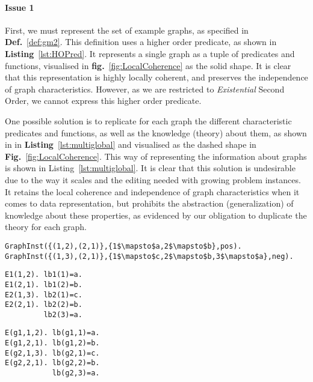 \documentclass{article}
\theoremstyle{definition}
\newcommand{\graphset}[1]{\ensuremath{\mathbb{#1}}}
\begin{document}
\paragraph{Issue 1}
First, we must represent the set of example graphs, as specified in \textbf{Def.}~\ref{def:gm2}. 
This definition uses a higher order predicate, as shown in \textbf{Listing}~\ref{lst:HOPred}. 
It represents a single graph as a tuple of predicates and functions, visualised in \textbf{fig.}~\ref{fig:LocalCoherence} as the solid shape.
It is clear that this representation is highly locally coherent, and preserves the independence of graph characteristics.
However, as we are restricted to \emph{Existential} Second Order, we cannot express this higher order predicate.

One possible solution is to replicate for each graph the different characteristic predicates and functions, as well as the knowledge (theory) about them, as shown in
in \textbf{Listing}~\ref{lst:multiglobal} and visualised as the dashed shape in \textbf{Fig.}~\ref{fig:LocalCoherence}.
This way of representing the information about graphs is shown in Listing~\ref{lst:multiglobal}.
It is clear that this solution is undesirable due to the way it scales and the editing needed with growing problem instances.
It retains the local coherence and independence of graph characteristics when it comes to data representation, but prohibits the abstraction (generalization) of knowledge about these properties, as evidenced by our obligation to duplicate the theory for each graph.

\begin{lstlisting}[mathescape,caption=Higher order predicate modelling the set $\graphset{G}$ of Def~\ref{def:gm2}.,label=lst:HOPred]
GraphInst({(1,2),(2,1)},{1$\mapsto$a,2$\mapsto$b},pos).
GraphInst({(1,3),(2,1)},{1$\mapsto$c,2$\mapsto$b,3$\mapsto$a},neg).
\end{lstlisting}
\begin{minipage}[t]{0.5\textwidth}
\begin{lstlisting}[mathescape,caption=Multiple global relations,label=lst:multiglobal]
E1(1,2). lb1(1)=a.
E1(2,1). lb1(2)=b.
E2(1,3). lb2(1)=c.
E2(2,1). lb2(2)=b.
         lb2(3)=a.
\end{lstlisting}
\end{minipage}
\begin{minipage}[t]{0.5\textwidth}
\begin{lstlisting}[mathescape,caption=Indexed global relation,label=lst:indexedglobal]
E(g1,1,2). lb(g1,1)=a.
E(g1,2,1). lb(g1,2)=b.
E(g2,1,3). lb(g2,1)=c.
E(g2,2,1). lb(g2,2)=b.
           lb(g2,3)=a.
\end{lstlisting}
\end{minipage}
\end{document}
